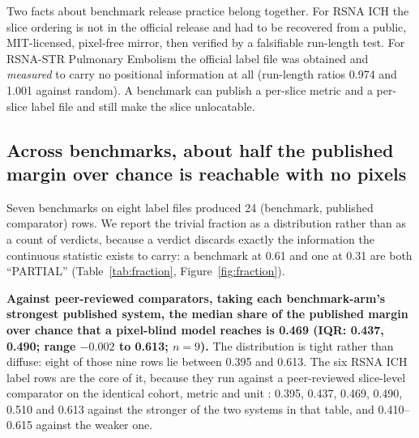 \documentclass[11pt,a4paper]{article}
\begin{document}
Two facts about benchmark release practice belong together. For RSNA ICH the
slice ordering is not in the official release and had to be recovered from a
public, MIT-licensed, pixel-free mirror, then verified by a falsifiable
run-length test. For RSNA-STR Pulmonary Embolism \citep{colak2021rsnape} the official
label file was obtained and \emph{measured} to carry no positional information at
all (run-length ratios 0.974 and 1.001 against random). A benchmark can publish a
per-slice metric and a per-slice label file and still make the slice
unlocatable.

\subsection{Across benchmarks, about half the published margin over chance is
reachable with no pixels}

Seven benchmarks on eight label files produced 24 (benchmark, published
comparator) rows. We report the trivial fraction as a distribution rather than as
a count of verdicts, because a verdict discards exactly the information the
continuous statistic exists to carry: a benchmark at 0.61 and one at 0.31 are
both ``PARTIAL'' (Table~\ref{tab:fraction}, Figure~\ref{fig:fraction}).

\textbf{Against peer-reviewed comparators, taking each benchmark-arm's strongest
published system, the median share of the published margin over chance that a
pixel-blind model reaches is 0.469 (IQR: 0.437, 0.490; range $-0.002$ to 0.613;
$n=9$).} The distribution is tight rather than diffuse: eight of those nine rows
lie between 0.395 and 0.613. The six RSNA ICH label rows are the core of it,
because they run against a peer-reviewed slice-level comparator on the identical
cohort, metric and unit \citep{burduja2020ich}: 0.395, 0.437, 0.469, 0.490, 0.510
and 0.613 against the stronger of the two systems in that table, and 0.410--0.615
against the weaker one.
\end{document}
